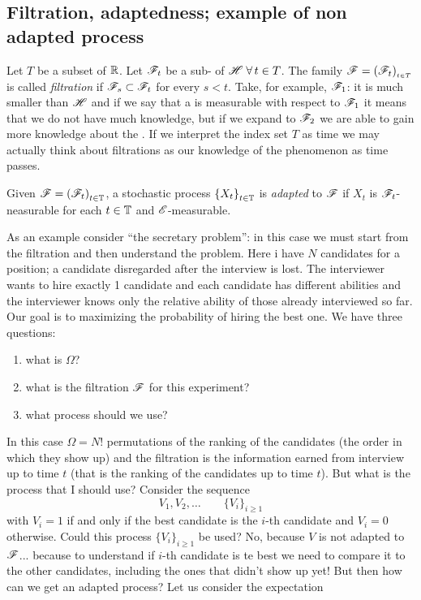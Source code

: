 \documentclass{report}
\begin{document}
\subsection{Filtration, adaptedness; example of non adapted process}
Let $T$ be a subset of $\mathbb{R}$. Let $\mathscr{F}_t$ be a sub-\sa{} of $\mathscr{H}\;\forall\, t\in T$. The family $\mathscr{F}=(\mathscr{F}_t)_{_{t\in T}}$ is called \emph{filtration} if $\mathscr{F}_s\subset\mathscr{F}_t$ for every $s<t$. Take, for example, $\mathscr{F}_1$: it is much smaller than $\mathscr{H}$ and if we say that a \rv{} is measurable with respect to $\mathscr{F}_1$ it means that we do not have much knowledge, but if we expand to $\mathscr{F}_2$ we are able to gain more knowledge about the \rv. If we interpret the index set $T$ as time we may actually think about filtrations as our knowledge of the phenomenon as time passes.
\begin{definition}
	Given $\mathscr{F}={(\mathscr{F}_t)}_{t\in\mathbb{T}}$, a stochastic process ${\{X_t\}}_{t\in\mathbb{T}}$ is \emph{adapted} to $\mathscr{F}$ if $X_{t}$ is $\mathscr{F}_t$-neasurable for each $t\in\mathbb{T}$ and $\mathscr{E}$-measurable.
\end{definition}
As an example consider ``the secretary problem'': in this case we must start from the filtration and then understand the problem.
Here i have $N$ candidates for a position; a candidate disregarded after the interview is lost. The interviewer wants to hire exactly 1 candidate and each candidate has different abilities and the interviewer knows only the relative ability of those already interviewed so far. Our goal is to maximizing the probability of hiring the best one. We have three questions:
\begin{enumerate}
	\item what is $\Omega$?
	\item what is the filtration $\mathscr{F}$ for this experiment?
	\item what process should we use?
\end{enumerate}
In this case $\Omega=N!$ permutations of the ranking of the candidates (the order in which they show up) and the filtration is the information earned from interview up to time $t$ (that is the ranking of the candidates up to time $t$). But what is the process that I should use? Consider the sequence
\[V_1,V_2,\ldots\qquad{\{V_i\}}_{i\geq 1}\]
with $V_i=1$ if and only if the best candidate is the $i$-th candidate and $V_i=0$ otherwise. Could this process ${\{V_i\}}_{i\geq 1}$ be used? No, because $V$ is not adapted to $\mathscr{F}$... because to understand if $i$-th candidate is te best we need to compare it to the other candidates, including the ones that didn't show up yet! But then how can we get an adapted process? Let us consider the expectation
\end{document}

